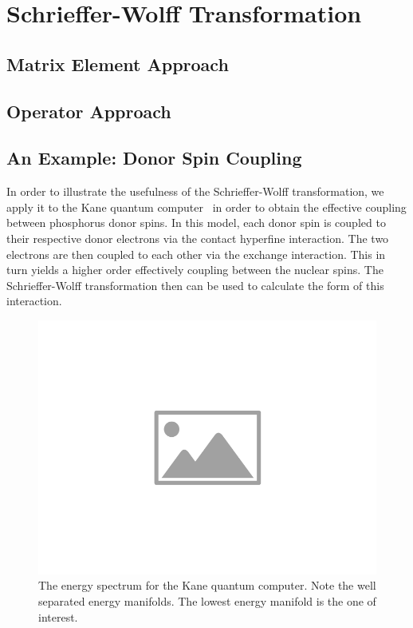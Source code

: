 \section{Schrieffer-Wolff Transformation}\label{SEC:sw_trans}

\subsection{Matrix Element Approach}
\subsection{Operator Approach}
\subsection{An Example: Donor Spin Coupling}

In order to illustrate the usefulness of the Schrieffer-Wolff transformation, we apply it to the Kane quantum computer~\cite{kane_1998} in order to obtain the effective coupling between phosphorus donor spins.
In this model, each donor spin is coupled to their respective donor electrons via the contact hyperfine interaction.
The two electrons are then coupled to each other via the exchange interaction.
This in turn yields a higher order effectively coupling between the nuclear spins.
The Schrieffer-Wolff transformation then can be used to calculate the form of this interaction.

\begin{figure}[htbp]
    \centering
    \includegraphics[width=0.75\columnwidth]{placeholder-image}
    \caption{The energy spectrum for the Kane quantum computer. Note the well separated energy manifolds. The lowest energy manifold is the one of interest.}
    \label{FIG:kane_qc_spectrum}
\end{figure}

